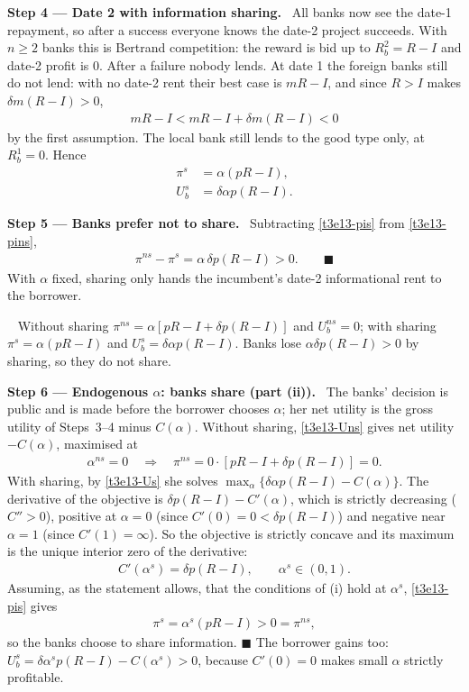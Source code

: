 \documentclass[11pt,a4paper]{article}
\newcommand{\step}[2]{\par\medskip\noindent\textbf{Step #1 --- #2.}~}
\newcommand{\answer}[1]{\par\smallskip\noindent\fbox{\textbf{Answer #1.}}~}
\begin{document}
\step{4}{Date 2 with information sharing} All banks now see the date-1 repayment, so after a success
everyone knows the date-2 project succeeds. With $n\ge2$ banks this is Bertrand competition: the reward
is bid up to $R_b^2=R-I$ and date-2 profit is $0$. After a failure nobody lends. At date 1 the foreign banks
still do not lend: with no date-2 rent their best case is $mR-I$, and since $R>I$ makes $\delta m(R-I)>0$,
\begin{align}
  mR-I < mR-I+\delta m(R-I) < 0 \nonumber
\end{align}
by the first assumption. The local bank still lends
to the good type only, at $R_b^1=0$. Hence
\begin{align}
  \pi^{s} &= \alpha(pR-I), \label{t3e13-pis}\\
  U_b^{s} &= \delta\alpha p(R-I). \label{t3e13-Us}
\end{align}

\step{5}{Banks prefer not to share} Subtracting \eqref{t3e13-pis} from \eqref{t3e13-pins},
\begin{align}
  \pi^{ns}-\pi^{s} = \alpha\,\delta p(R-I) > 0. \qquad\blacksquare \label{t3e13-diff}
\end{align}
With $\alpha$ fixed, sharing only hands the incumbent's date-2 informational rent to the borrower.

\answer{(i)} Without sharing $\pi^{ns}=\alpha[pR-I+\delta p(R-I)]$ and $U_b^{ns}=0$; with sharing $\pi^s=\alpha(pR-I)$ and $U_b^s=\delta\alpha p(R-I)$. Banks lose $\alpha\delta p(R-I)>0$ by sharing, so they do not share.

\step{6}{Endogenous $\alpha$: banks share (part (ii))} The banks' decision is public and is made before
the borrower chooses $\alpha$; her net utility is the gross utility of Steps~3--4 minus $C(\alpha)$.
Without sharing, \eqref{t3e13-Uns} gives net utility $-C(\alpha)$, maximised at
\begin{align}
  \alpha^{ns} = 0 \quad\Rightarrow\quad \pi^{ns} = 0\cdot[pR-I+\delta p(R-I)] = 0. \label{t3e13-ans}
\end{align}
With sharing, by \eqref{t3e13-Us} she solves $\max_\alpha\{\delta\alpha p(R-I)-C(\alpha)\}$. The derivative of the objective is $\delta p(R-I)-C'(\alpha)$, which is strictly decreasing ($C''>0$), positive at $\alpha=0$ (since $C'(0)=0<\delta p(R-I)$) and negative near $\alpha=1$ (since $C'(1)=\infty$). So the objective is strictly concave and its maximum is the unique interior zero of the derivative:
\begin{align}
  C'(\alpha^s) = \delta p(R-I), \qquad \alpha^s\in(0,1). \label{t3e13-foc}
\end{align}
Assuming, as the statement allows, that the conditions of (i) hold at $\alpha^s$, \eqref{t3e13-pis} gives
\begin{align}
  \pi^s = \alpha^s(pR-I) > 0 = \pi^{ns}, \label{t3e13-share}
\end{align}
so the banks choose to share information. $\blacksquare$ The borrower gains too:
$U_b^s=\delta\alpha^sp(R-I)-C(\alpha^s)>0$, because $C'(0)=0$ makes small $\alpha$ strictly profitable.
\end{document}
